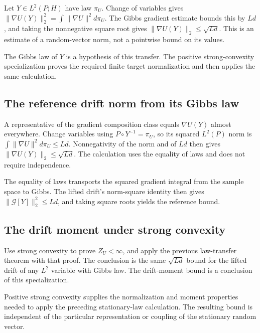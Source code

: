 \documentclass[11pt,a4paper]{article}
\begin{document}
Let \(Y\in L^2(P;H)\) have law \(\pi_U\). Change of variables gives \(\|\nabla U(Y)\|_2^2=\int\|\nabla U\|^2d\pi_U\). The Gibbs gradient estimate bounds this by \(Ld\), and taking the nonnegative square root gives \(\|\nabla U(Y)\|_2\le\sqrt{Ld}\). This is an estimate of a random-vector norm, not a pointwise bound on its values.



The Gibbs law of \(Y\) is a hypothesis of this transfer. The positive strong-convexity specialization proves the required finite target normalization and then applies the same calculation.


\subsection{\texorpdfstring{The reference drift norm from its Gibbs law}{The reference drift norm from its Gibbs law}}


A representative of the gradient composition class equals \(\nabla U(Y)\) almost everywhere. Change variables using \(P\circ Y^{-1}=\pi_U\), so its squared \(L^2(P)\) norm is \(\int\|\nabla U\|^2d\pi_U\le Ld\). Nonnegativity of the norm and of \(Ld\) then gives \(\|\nabla U(Y)\|_2\le\sqrt{Ld}\). The calculation uses the equality of laws and does not require independence.



The equality of laws transports the squared gradient integral from the sample space to Gibbs. The lifted drift's norm-square identity then gives \(\|\mathcal G[Y]\|_2^2\le Ld\), and taking square roots yields the reference bound.


\subsection{\texorpdfstring{The drift moment under strong convexity}{The drift moment under strong convexity}}


Use strong convexity to prove \(Z_U<\infty\), and apply the previous law-transfer theorem with that proof. The conclusion is the same \(\sqrt{Ld}\) bound for the lifted drift of any \(L^2\) variable with Gibbs law. The drift-moment bound is a conclusion of this specialization.



Positive strong convexity supplies the normalization and moment properties needed to apply the preceding stationary-law calculation. The resulting bound is independent of the particular representation or coupling of the stationary random vector.
\end{document}
